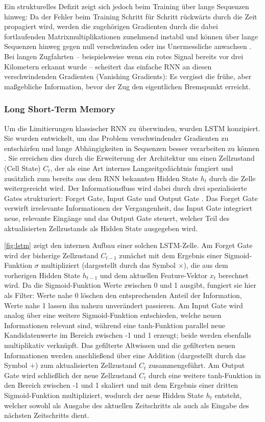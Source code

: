 Ein strukturelles Defizit zeigt sich jedoch beim Training über lange Sequenzen hinweg: Da der Fehler beim Training Schritt für Schritt rückwärts durch die Zeit propagiert wird, werden die zugehörigen Gradienten durch die dabei fortlaufenden Matrixmultiplikationen zunehmend instabil und können über lange Sequenzen hinweg gegen null verschwinden oder ins Unermessliche anwachsen \cite[vgl.~S.~289]{chap2_Goo16}. 
Bei langen Zugfahrten -- beispielsweise wenn ein rotes Signal bereits vor drei Kilometern erkannt wurde -- scheitert das einfache \gls{RNN} an diesen verschwindenden Gradienten (Vanishing Gradients): Es vergisst die frühe, aber maßgebliche Information, bevor der Zug den eigentlichen Bremspunkt erreicht.

\subsubsection{Long Short-Term Memory}

Um die Limitierungen klassischer \gls{RNN} zu überwinden, wurden \gls{LSTM} konzipiert. 
Sie wurden entwickelt, um das Problem verschwindender Gradienten zu entschärfen und lange Abhängigkeiten in Sequenzen besser verarbeiten zu können \cite[vgl.~S.~4]{chap2_Ife23}. 
Sie erreichen dies durch die Erweiterung der Architektur um einen Zellzustand (Cell State) $C_t$, der als eine Art internes Langzeitgedächtnis fungiert und zusätzlich zum bereits aus dem \gls{RNN} bekannten Hidden State $h_t$ durch die Zelle weitergereicht wird. 
Der Informationsfluss wird dabei durch drei spezialisierte Gates strukturiert: Forget Gate, Input Gate und Output Gate \cite[vgl.~S.~4]{chap2_Ife23}. 
Das Forget Gate verwirft irrelevante Informationen der Vergangenheit, das Input Gate integriert neue, relevante Eingänge und das Output Gate steuert, welcher Teil des aktualisierten Zellzustands als Hidden State ausgegeben wird.

\autoref{fig:lstm} zeigt den internen Aufbau einer solchen LSTM-Zelle. 
Am Forget Gate wird der bisherige Zellzustand $C_{t-1}$ zunächst mit dem Ergebnis einer Sigmoid-Funktion $\sigma$ multipliziert (dargestellt durch das Symbol $\times$), die aus dem vorherigen Hidden State $h_{t-1}$ und dem aktuellen Feature-Vektor $x_t$ berechnet wird. 
Da die Sigmoid-Funktion Werte zwischen 0 und 1 ausgibt, fungiert sie hier als Filter: Werte nahe 0 löschen den entsprechenden Anteil der Information, Werte nahe 1 lassen ihn nahezu unverändert passieren. 
Am Input Gate wird analog über eine weitere Sigmoid-Funktion entschieden, welche neuen Informationen relevant sind, während eine tanh-Funktion parallel neue Kandidatenwerte im Bereich zwischen -1 und 1 erzeugt; beide werden ebenfalls multiplikativ verknüpft. 
Das gefilterte Altwissen und die gefilterten neuen Informationen werden anschließend über eine Addition (dargestellt durch das Symbol $+$) zum aktualisierten Zellzustand $C_t$ zusammengeführt. 
Am Output Gate wird schließlich der neue Zellzustand $C_t$ durch eine weitere tanh-Funktion in den Bereich zwischen -1 und 1 skaliert und mit dem Ergebnis einer dritten Sigmoid-Funktion multipliziert, wodurch der neue Hidden State $h_t$ entsteht, welcher sowohl als Ausgabe des aktuellen Zeitschritts als auch als Eingabe des nächsten Zeitschritts dient.

